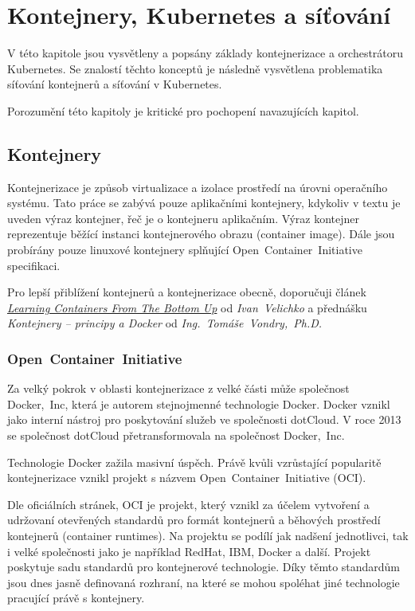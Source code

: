 \chapter{Kontejnery, Kubernetes a síťování}
\begin{chapterabstract}
V této kapitole jsou vysvětleny a popsány základy kontejnerizace a orchestrátoru Kubernetes. Se znalostí těchto konceptů je následně vysvětlena problematika síťování kontejnerů a síťování v Kubernetes.  

Porozumění této kapitoly je kritické pro pochopení navazujících kapitol.
\end{chapterabstract}

\section{Kontejnery}
Kontejnerizace je způsob virtualizace a izolace prostředí na úrovni operačního systému. Tato práce se zabývá pouze aplikačními kontejnery, kdykoliv v textu je uveden výraz kontejner, řeč je o kontejneru aplikačním. Výraz kontejner reprezentuje běžící instanci kontejnerového obrazu (container image). Dále jsou probírány pouze linuxové kontejnery splňující Open~Container~Initiative specifikaci.

Pro lepší přiblížení kontejnerů a kontejnerizace obecně, doporučuji článek \href{https://iximiuz.com/en/posts/container-learning-path/}{\textit{Learning Containers From The Bottom Up}}\cite{velichko_2021_learning} od \textit{Ivan~Velichko} a přednášku \textit{Kontejnery -- principy a Docker} od \textit{Ing.~Tomáše~Vondry,~Ph.D.}\cite{vondra_2022_kontejnery}

\subsection{Open~Container~Initiative}
Za velký pokrok v oblasti kontejnerizace z velké části může společnost Docker,~Inc, která je autorem stejnojmenné technologie Docker. Docker vznikl jako interní nástroj pro poskytování služeb ve společnosti dotCloud. V roce 2013 se společnost dotCloud přetransformovala na společnost Docker,~Inc. \cite{poulton_2020_docker}

Technologie Docker zažila masivní úspěch. Právě kvůli vzrůstající popularitě kontejnerizace vznikl projekt s názvem Open~Container~Initiative (OCI).

Dle oficiálních stránek, OCI je projekt, který vznikl za účelem vytvoření a udržovaní otevřených standardů pro formát kontejnerů a běhových prostředí kontejnerů (container runtimes). Na projektu se podílí jak nadšení jednotlivci, tak i velké společnosti jako je například RedHat, IBM, Docker a další. Projekt poskytuje sadu standardů pro kontejnerové technologie. Díky těmto standardům jsou dnes jasně definovaná rozhraní, na které se mohou spoléhat jiné technologie pracující právě s kontejnery. \cite{thelinuxfoundation_about}

